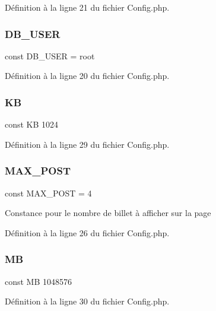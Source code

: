 Définition à la ligne 21 du fichier Config.\+php.

\mbox{\label{_config_8php_a1d1d99f8e08f387d84fe9848f3357156}} 
\subsubsection{\texorpdfstring{D\+B\+\_\+\+U\+S\+ER}{DB\_USER}}
{\footnotesize\ttfamily const D\+B\+\_\+\+U\+S\+ER = \textquotesingle{}root\textquotesingle{}}



Définition à la ligne 20 du fichier Config.\+php.

\mbox{\label{_config_8php_a4f06cdd0c63f3ce691804d6c90ea6c32}} 
\subsubsection{\texorpdfstring{KB}{KB}}
{\footnotesize\ttfamily const KB 1024}



Définition à la ligne 29 du fichier Config.\+php.

\mbox{\label{_config_8php_ae6f0a6c86ad9f61cbc99ad3c4180b481}} 
\subsubsection{\texorpdfstring{M\+A\+X\+\_\+\+P\+O\+ST}{MAX\_POST}}
{\footnotesize\ttfamily const M\+A\+X\+\_\+\+P\+O\+ST = 4}

Constance pour le nombre de billet à afficher sur la page 

Définition à la ligne 26 du fichier Config.\+php.

\mbox{\label{_config_8php_a91c734126e699a6ba53fe57e06bb8b49}} 
\subsubsection{\texorpdfstring{MB}{MB}}
{\footnotesize\ttfamily const MB 1048576}



Définition à la ligne 30 du fichier Config.\+php.

